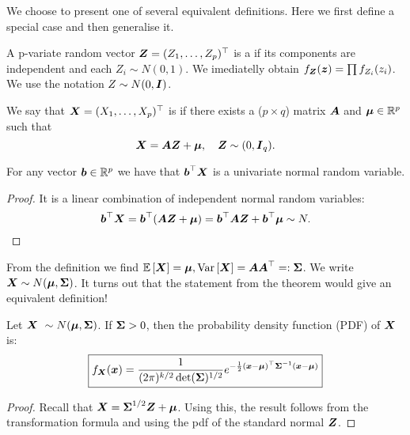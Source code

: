We choose to present one of several equivalent definitions. Here we first define a special case and then generalise it. 
\begin{definition}
    A p-variate random vector $\boldsymbol{Z}=(Z_1, \dots, Z_p)^\top$ is a  if its components are independent and each $Z_i\sim N(0,1)$. We imediatelly obtain $f_{\boldsymbol{Z}}(\boldsymbol{z}) = \prod f_{Z_i} (z_i)$. We use the notation $Z\sim N(0, \boldsymbol{I})$.
\end{definition}
\begin{definition}
    We say that $\boldsymbol{X} = (X_1,\dots, X_p)^\top$ is  if there exists a ($p\times q$) matrix $\boldsymbol{A}$ and $\boldsymbol{\mu}\in\mathbb{R}^p$ such that 
    $$
        \boldsymbol{X} = \boldsymbol{A} \boldsymbol{Z} + \boldsymbol{\mu}, \quad \boldsymbol{Z} \sim (0, \boldsymbol{I}_q).
    $$
\end{definition}
\begin{theorem}
    For any vector $\boldsymbol{b}\in\mathbb{R}^p$ we have that $\boldsymbol{b}^\top \boldsymbol{X}$ is a univariate normal random variable.
\end{theorem}
\begin{proof}
    It is a linear combination of independent normal random variables:
    $$
        \boldsymbol{b}^\top \boldsymbol{X} = \boldsymbol{b}^\top(\boldsymbol{A}\boldsymbol{Z} + \boldsymbol{\mu}) = \boldsymbol{b}^\top \boldsymbol{A} \boldsymbol{Z} + \boldsymbol{b}^\top\boldsymbol{\mu} \sim N. 
    $$
\end{proof}
From the definition we find $\mathbb{E}\left[\boldsymbol{X}\right] = \boldsymbol{\mu}, \mathrm{Var}\left[\boldsymbol{X}\right] = \boldsymbol{A}\boldsymbol{A}^\top =: \boldsymbol{\Sigma}$. We write $\X \sim N(\M, \SS)$. It turns out that the statement from the theorem would give an equivalent definition!
\begin{theorem}
    Let $\X \sim N(\M, \SS)$. If $\boldsymbol{\Sigma} > 0$, then the probability density function (PDF) of $\boldsymbol{X}$ is:
    \begin{equation}
        \boxed{
            f_{\boldsymbol{X}} (\boldsymbol{x}) = \frac{1}{(2\pi)^{k/2}\det(\boldsymbol{\Sigma})^{1/2}} e^{-\frac{1}{2}(\boldsymbol{x}-\boldsymbol{\mu})^\top\boldsymbol{\Sigma}^{-1}(\boldsymbol{x}-\boldsymbol{\mu})}
        }        
    \end{equation}
\end{theorem}
\begin{proof}
    Recall that $\boldsymbol{X} = \boldsymbol{\Sigma}^{1/2}\boldsymbol{Z} + \boldsymbol{\mu}$. Using this, the result follows from the transformation formula and using the pdf of the standard normal $\boldsymbol{Z}$.  
\end{proof}
 
